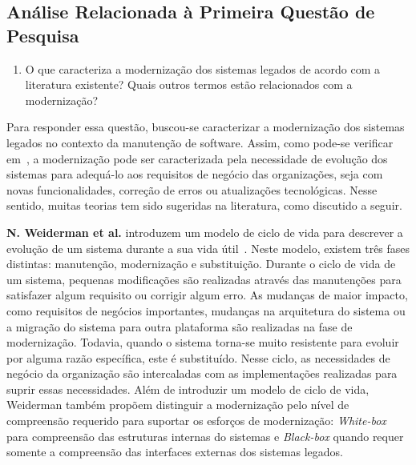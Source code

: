 \subsection{An\'{a}lise Relacionada à Primeira Questão de Pesquisa}

\begin{enumerate}[(QP1)]

\item O que caracteriza a modernização dos sistemas legados de 
acordo com a literatura existente? Quais outros termos estão relacionados 
com a modernização?

\end{enumerate}

Para responder essa questão, buscou-se caracterizar a modernização dos sistemas 
legados no contexto da manutenção de software. Assim, como pode-se 
verificar em~\cite{S01_bennett2000software, S9_bianchi:2003, S3_Bisbal:1999, S15_Comella-DordaASurvey2000, S2_erlikh:2000}, 
a modernização pode ser caracterizada pela necessidade de evolução dos sistemas para adequá-lo aos requisitos de negócio das organizações, 
seja com novas funcionalidades, correção de erros ou atualizações tecnológicas. Nesse sentido, muitas teorias 
tem sido sugeridas na literatura, como discutido a seguir. 

\textbf{N. Weiderman et al.} introduzem um modelo de ciclo de vida 
para descrever a evolução de um sistema durante a sua vida útil~\cite{S15_Comella-DordaASurvey2000, Seacord:2003, S12_WeidermanApproaches:1997}. 
Neste modelo, existem três fases distintas: manutenção, modernização e substituição. Durante o ciclo de vida de um sistema, pequenas 
modificações são realizadas através das manutenções para satisfazer algum requisito ou corrigir algum erro. As mudanças de maior impacto, 
como requisitos de negócios importantes, mudanças na arquitetura do sistema ou a migração do sistema para outra plataforma são realizadas na fase 
de modernização. Todavia, quando o sistema torna-se muito resistente para evoluir por alguma razão específica, este é substituído. 
Nesse ciclo, as necessidades de negócio da organização são intercaladas com as implementações realizadas para suprir essas necessidades. 
Além de introduzir um modelo de ciclo de vida, Weiderman também propõem distinguir a modernização pelo nível de compreensão requerido para suportar 
os esforços de modernização: \textit{White-box} para compreensão das estruturas internas do sistemas e \textit{Black-box} quando requer somente a compreensão das interfaces externas dos sistemas legados.

